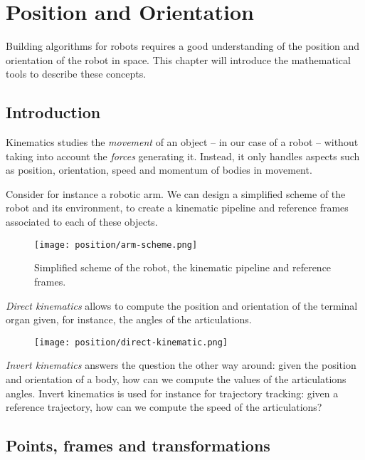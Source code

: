 \section{Position and Orientation}
Building algorithms for robots requires a good understanding of the position and orientation of the robot in space. This chapter will introduce the mathematical tools to describe these concepts.
\subsection{Introduction}
Kinematics studies the \emph{movement} of an object -- in our case of a robot -- without taking into account the \emph{forces} generating it. Instead, it only handles aspects such as position, orientation, speed and momentum of bodies in movement.

Consider for instance a robotic arm. We can design a simplified scheme of the robot and its environment, to create a kinematic pipeline and reference frames associated to each of these objects.

\begin{figure}[H]
    \centering
    \texttt{[image: position/arm-scheme.png]}
    \caption{Simplified scheme of the robot, the kinematic pipeline and reference frames.}
\end{figure}

\emph{Direct kinematics} allows to compute the position and orientation of the terminal organ given, for instance, the angles of the articulations.

\begin{figure}[H]
    \centering
    \texttt{[image: position/direct-kinematic.png]}
\end{figure}

\emph{Invert kinematics} answers the question the other way around: given the position and orientation of a body, how can we compute the values of the articulations angles. Invert kinematics is used for instance for trajectory tracking: given a reference trajectory, how can we compute the speed of the articulations?

\subsection{Points, frames and transformations}
